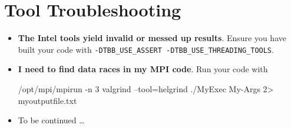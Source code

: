 \section{Tool Troubleshooting}
\begin{itemize}
  \item \textbf{The Intel tools yield invalid or messed up results}. Ensure 
    you have built your code with \texttt{-DTBB\_USE\_ASSERT -DTBB\_USE\_THREADING\_TOOLS}.
  \item \textbf{I need to find data races in my MPI code}. Run your code with
    \begin{code}
    /opt/mpi/mpirun -n 3 valgrind --tool=helgrind ./MyExec My-Args 2> myoutputfile.txt
    \end{code} 
  \item To be continued \dots
\end{itemize}



